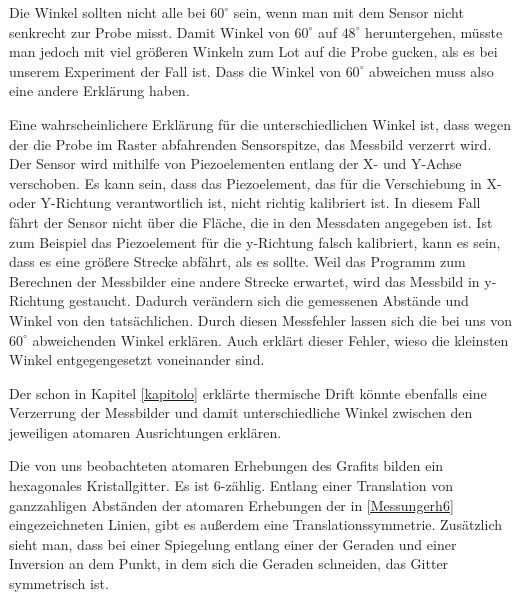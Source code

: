 \documentclass[10pt,a4paper]{article}
\begin{document}
Die Winkel sollten nicht alle bei $60^\circ$ sein, wenn man mit dem Sensor nicht senkrecht zur Probe misst. Damit Winkel von $60^\circ$ auf $48^\circ$ heruntergehen, müsste man jedoch mit viel größeren Winkeln zum Lot auf die Probe gucken, als es bei unserem Experiment der Fall ist. Dass die Winkel von $60^\circ$ abweichen muss also eine andere Erklärung haben.

 Eine wahrscheinlichere Erklärung für die unterschiedlichen Winkel ist, dass wegen der die Probe im Raster abfahrenden Sensorspitze, das Messbild verzerrt wird. Der Sensor wird mithilfe von Piezoelementen entlang der X- und Y-Achse verschoben. Es kann sein, dass das Piezoelement, das für die Verschiebung in X- oder Y-Richtung verantwortlich ist, nicht richtig kalibriert ist. In diesem Fall fährt der Sensor nicht über die Fläche, die in den Messdaten angegeben ist. Ist zum Beispiel das Piezoelement für die y-Richtung falsch kalibriert, kann es sein, dass es eine größere Strecke abfährt, als es sollte. Weil das Programm zum Berechnen der Messbilder eine andere Strecke erwartet, wird das Messbild in y-Richtung gestaucht. Dadurch verändern sich die gemessenen Abstände und Winkel von den tatsächlichen. Durch diesen Messfehler lassen sich die bei uns von $60^\circ$ abweichenden Winkel erklären. Auch erklärt dieser Fehler, wieso die kleinsten Winkel entgegengesetzt voneinander sind.
 
 Der schon in Kapitel \ref{kapitolo} erklärte thermische Drift könnte ebenfalls eine Verzerrung der Messbilder und damit unterschiedliche Winkel zwischen den jeweiligen atomaren Ausrichtungen erklären.
 
Die von uns beobachteten atomaren Erhebungen des Grafits bilden ein hexagonales Kristallgitter. Es ist 6-zählig. Entlang einer Translation von ganzzahligen Abständen der atomaren Erhebungen der in \ref{Messungerh6} eingezeichneten Linien, gibt es außerdem eine Translationssymmetrie. Zusätzlich sieht man, dass bei einer Spiegelung entlang einer der Geraden und einer Inversion an dem Punkt, in dem sich die Geraden schneiden, das Gitter symmetrisch ist.
\end{document}
